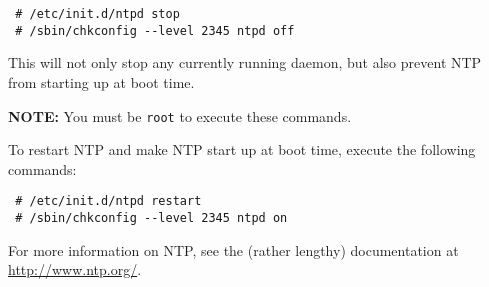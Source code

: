 \begin{verbatim}
 # /etc/init.d/ntpd stop
 # /sbin/chkconfig --level 2345 ntpd off
\end{verbatim}

This will not only stop any currently running  daemon, but
also prevent NTP from starting up at boot time.

\bigskip 

{\bf NOTE:} You must be {\tt root} to execute these commands.

\bigskip 

To restart NTP and make NTP start up at boot time, execute the following
commands:

\begin{verbatim}
 # /etc/init.d/ntpd restart
 # /sbin/chkconfig --level 2345 ntpd on
\end{verbatim}

For more information on NTP, see the (rather lengthy) documentation at
\url{http://www.ntp.org/}.


